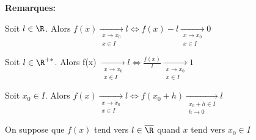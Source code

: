 \documentclass[12pt,twoside,a4paper]{article}
\begin{document}
		\begin{flushleft}
			\textbf{Remarques:}
			\begin{liste}
				\item Soit $l\in\R$. Alors $f(x) \mathop{\longrightarrow}\limits_{\substack{x\rightarrow x_0\\x\in I}} l \iff f(x) -l \mathop{\longrightarrow}\limits_{\substack{x\rightarrow x_0\\x\in I}} 0$
				\item Soit $l\in\R^{+*}$. Alors f(x) $\mathop{\longrightarrow}\limits_{\substack{x\rightarrow x_0\\x\in I}} l \iff \frac{f(x)}{l}\mathop{\longrightarrow}\limits_{\substack{x\rightarrow x_0\\x\in I}} 1$
				\item Soit $x_0\in I$. Alors $f(x)\mathop{\longrightarrow}\limits_{\substack{x\rightarrow x_0\\x\in I}} l \iff f(x_0+h)\mathop{\longrightarrow}\limits_{\substack{x_0+h\in I\\h\rightarrow 0}} l$
			\end{liste}
		\end{flushleft}
		\begin{prop}
			On suppose que $f(x)$ tend vers $l\in\overline{\R}$ quand $x$ tend vers $x_0\in I$
		\end{prop}
\end{document}

